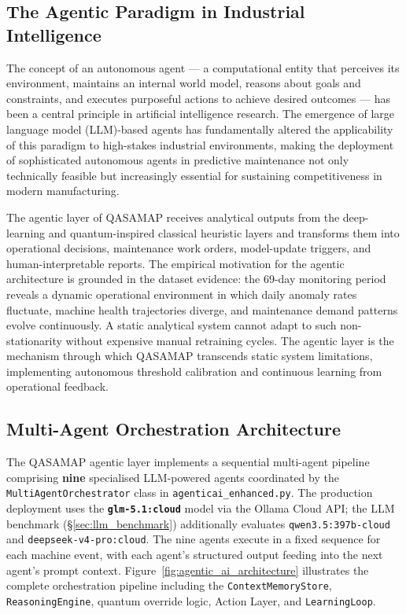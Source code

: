 \subsection{The Agentic Paradigm in Industrial Intelligence}

The concept of an autonomous agent --- a computational entity that perceives its environment, maintains an internal world model, reasons about goals and constraints, and executes purposeful actions to achieve desired outcomes --- has been a central principle in artificial intelligence research. The emergence of large language model (LLM)-based agents has fundamentally altered the applicability of this paradigm to high-stakes industrial environments, making the deployment of sophisticated autonomous agents in predictive maintenance not only technically feasible but increasingly essential for sustaining competitiveness in modern manufacturing.

The agentic layer of QASAMAP receives analytical outputs from the deep-learning and quantum-inspired classical heuristic layers and transforms them into operational decisions, maintenance work orders, model-update triggers, and human-interpretable reports. The empirical motivation for the agentic architecture is grounded in the dataset evidence: the 69-day monitoring period reveals a dynamic operational environment in which daily anomaly rates fluctuate, machine health trajectories diverge, and maintenance demand patterns evolve continuously. A static analytical system cannot adapt to such non-stationarity without expensive manual retraining cycles. The agentic layer is the mechanism through which QASAMAP transcends static system limitations, implementing autonomous threshold calibration and continuous learning from operational feedback.

\subsection{Multi-Agent Orchestration Architecture}

The QASAMAP agentic layer implements a sequential multi-agent pipeline comprising \textbf{nine} specialised LLM-powered agents coordinated by the \texttt{MultiAgentOrchestrator} class in \texttt{agenticai\_enhanced.py}. The production deployment uses the \textbf{\texttt{glm-5.1:cloud}} model via the Ollama Cloud API; the LLM benchmark (\S\ref{sec:llm_benchmark}) additionally evaluates \texttt{qwen3.5:397b-cloud} and \texttt{deepseek-v4-pro:cloud}. The nine agents execute in a fixed sequence for each machine event, with each agent's structured output feeding into the next agent's prompt context. Figure~\ref{fig:agentic_ai_architecture} illustrates the complete orchestration pipeline including the \texttt{ContextMemoryStore}, \texttt{ReasoningEngine}, quantum override logic, Action Layer, and \texttt{LearningLoop}.

